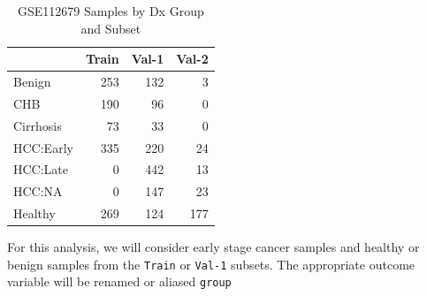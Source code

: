 \documentclass[
]{book}
\begin{document}
\begin{table}

\caption{\label{tab:hcc5hmC-preproc-loadData}GSE112679 Samples by Dx Group and Subset}
\centering
\begin{tabular}[t]{l|r|r|r}
\hline
  & Train & Val-1 & Val-2\\
\hline
Benign & 253 & 132 & 3\\
\hline
CHB & 190 & 96 & 0\\
\hline
Cirrhosis & 73 & 33 & 0\\
\hline
HCC:Early & 335 & 220 & 24\\
\hline
HCC:Late & 0 & 442 & 13\\
\hline
HCC:NA & 0 & 147 & 23\\
\hline
Healthy & 269 & 124 & 177\\
\hline
\end{tabular}
\end{table}

For this analysis, we will consider early stage cancer samples
and healthy or benign samples from the \texttt{Train} or \texttt{Val-1} subsets.
The appropriate outcome variable will be renamed or aliased \texttt{group}
\end{document}
